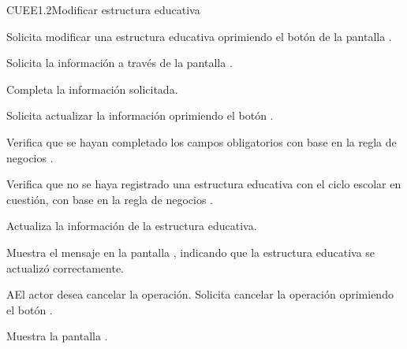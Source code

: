 \begin{UseCase}{CUEE1.2}{Modificar estructura educativa}
{\begin{UClist}
			\UCli {} 
		\end{UClist}
	}
\end{UseCase}

\begin{UCtrayectoria}
	\UCpaso [\UCactor] Solicita modificar una estructura educativa oprimiendo el botón  de la pantalla . 
	
	\UCpaso [\UCsist] Solicita la información a través de la pantalla .
	
	\UCpaso [\UCactor] Completa la información solicitada. \label{CUEE1.2:CompletaInfo}
	
	\UCpaso [\UCactor] Solicita actualizar la información oprimiendo el botón . 
	
	\UCpaso [\UCsist] Verifica que se hayan completado los campos obligatorios con base en la regla de negocios . 
	
	\UCpaso [\UCsist] Verifica que no se haya registrado una estructura educativa con el ciclo escolar en cuestión, con base en la regla de negocios . 
	
	\UCpaso [\UCsist] Actualiza la información de la estructura educativa.
	
	\UCpaso [\UCsist] Muestra el mensaje  en la pantalla , indicando que la estructura educativa se actualizó correctamente.	
	
\end{UCtrayectoria}


\begin{UCtrayectoriaA}{A}{El actor desea cancelar la operación.}
	\UCpaso [\UCactor] Solicita cancelar la operación oprimiendo el botón .
	
	\UCpaso [\UCsist] Muestra la pantalla . 
\end{UCtrayectoriaA}

